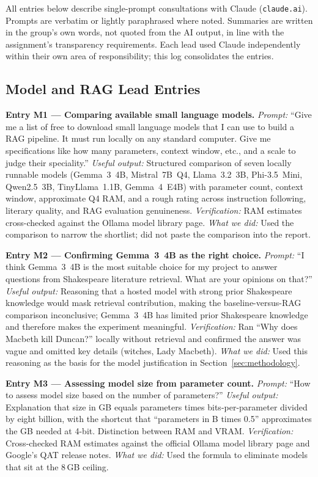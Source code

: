 \documentclass[10pt,conference]{IEEEtran}
\begin{document}
All entries below describe single-prompt consultations with Claude
(\texttt{claude.ai}). Prompts are verbatim or lightly paraphrased
where noted. Summaries are written in the group's own words, not
quoted from the AI output, in line with the assignment's
transparency requirements. Each lead used Claude independently
within their own area of responsibility; this log consolidates the
entries.

\subsection*{Model and RAG Lead Entries}

\textbf{Entry M1 --- Comparing available small language models.}
\textit{Prompt:} ``Give me a list of free to download small language
models that I can use to build a RAG pipeline. It must run locally
on any standard computer. Give me specifications like how many
parameters, context window, etc., and a scale to judge their
speciality.''
\textit{Useful output:} Structured comparison of seven locally
runnable models (Gemma~3~4B, Mistral~7B~Q4, Llama~3.2~3B,
Phi-3.5~Mini, Qwen2.5~3B, TinyLlama~1.1B, Gemma~4~E4B) with
parameter count, context window, approximate Q4 RAM, and a rough
rating across instruction following, literary quality, and RAG
evaluation genuineness.
\textit{Verification:} RAM estimates cross-checked against the
Ollama model library page.
\textit{What we did:} Used the comparison to narrow the shortlist;
did not paste the comparison into the report.

\textbf{Entry M2 --- Confirming Gemma~3~4B as the right choice.}
\textit{Prompt:} ``I think Gemma~3~4B is the most suitable choice
for my project to answer questions from Shakespeare literature
retrieval. What are your opinions on that?''
\textit{Useful output:} Reasoning that a hosted model with strong
prior Shakespeare knowledge would mask retrieval contribution,
making the baseline-versus-RAG comparison inconclusive; Gemma~3~4B
has limited prior Shakespeare knowledge and therefore makes the
experiment meaningful.
\textit{Verification:} Ran ``Why does Macbeth kill Duncan?''
locally without retrieval and confirmed the answer was vague and
omitted key details (witches, Lady Macbeth).
\textit{What we did:} Used this reasoning as the basis for the
model justification in Section~\ref{sec:methodology}.

\textbf{Entry M3 --- Assessing model size from parameter count.}
\textit{Prompt:} ``How to assess model size based on the number of
parameters?''
\textit{Useful output:} Explanation that size in GB equals
parameters times bits-per-parameter divided by eight billion, with
the shortcut that ``parameters in B times 0.5'' approximates the
GB needed at 4-bit. Distinction between RAM and VRAM.
\textit{Verification:} Cross-checked RAM estimates against the
official Ollama model library page and Google's QAT release notes.
\textit{What we did:} Used the formula to eliminate models that
sit at the 8\,GB ceiling.
\end{document}
